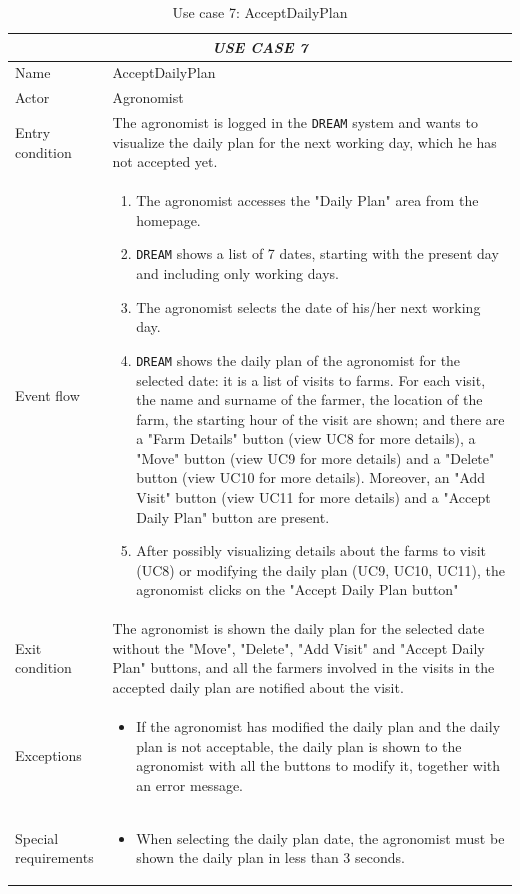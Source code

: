 \documentclass{article}
\begin{document}
\centering
\begin{longtable}{|p{3.5cm}|m{8cm}|}
\caption{Use case 7: AcceptDailyPlan}
 \label{uc7}
 \hline
 \multicolumn{2}{|c|}{\cellcolor{white}\emph{USE CASE 7}} \\
 \endfirsthead
 \endhead
 \endfoot
 \endlastfoot
 \hline
 Name & AcceptDailyPlan\\
 \hline
 Actor & Agronomist\\
 \hline
 Entry condition & The agronomist is logged in the \verb|DREAM| system and wants to visualize the daily plan for the next working day, which he has not accepted yet.\\
 \hline
 Event flow & \begin{enumerate}
    \item The agronomist accesses the "Daily Plan" area from the homepage.
    \item \verb|DREAM| shows a list of 7 dates, starting with the present day and including only working days.
    \item The agronomist selects the date of his/her next working day.
    \item \verb|DREAM| shows the daily plan of the agronomist for the selected date: it is a list of visits to farms. For each visit, the name and surname of the farmer, the location of the farm, the starting hour of the visit are shown; and there are a "Farm Details" button (view UC8 for more details), a "Move" button (view UC9 for more details) and a "Delete" button (view UC10 for more details). Moreover, an "Add Visit" button (view UC11 for more details) and a "Accept Daily Plan" button are present.
    \item After possibly visualizing details about the farms to visit (UC8) or modifying the daily plan (UC9, UC10, UC11), the agronomist clicks on the "Accept Daily Plan button"
 \end{enumerate}\\
 \hline
 Exit condition & The agronomist is shown the daily plan for the selected date without the "Move", "Delete", "Add Visit" and "Accept Daily Plan" buttons, and all the farmers involved in the visits in the accepted daily plan are notified about the visit.\\
 \hline
 Exceptions & \begin{itemize}
     \item If the agronomist has modified the daily plan and the daily plan is not acceptable, the daily plan is shown to the agronomist with all the buttons to modify it, together with an error message.
 \end{itemize}\\
 \hline
 Special requirements &\begin{itemize}
     \item When selecting the daily plan date, the agronomist must be shown the daily plan in less than 3 seconds.
 \end{itemize}\\
 \hline
\end{longtable}
\end{document}
